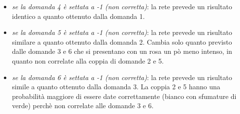 \begin{itemize}
\begin{itemize}
\item \textit{se la domanda 4 \`e settata a -1 (non corretta)}: la rete prevede un risultato  identico a quanto ottenuto dalla domanda 1.
\item \textit{se la domanda 5 \`e settata a -1 (non corretta)}: la rete prevede un risultato similare a quanto ottenuto dalla domanda 2. Cambia solo quanto previsto dalle domande 3 e 6 che si presentano con un rosa un p\`o meno intenso, in quanto non  correlate alla coppia di domande 2 e 5.
\item \textit{se la domanda 6 \`e settata a -1 (non corretta)}: la rete prevede un risultato simile a quanto ottenuto dalla domanda 3. La coppia 2 e 5 hanno una probabilit\`a maggiore di essere date correttamente (bianco con sfumature di verde) perch\`e non correlate alle domande 3 e 6.
\end{itemize}
\end{itemize}

